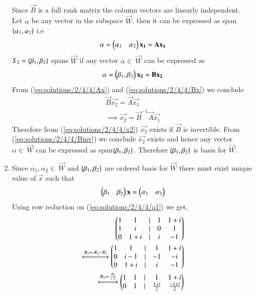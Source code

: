 \begin{enumerate}[label=\emph{\alph*)}]
\begin{align}
\end{align}
Since $\vec{B}$ is a full rank matrix the column vectors are linearly independent.\\
Let $\alpha$ be any vector in the subspace $\vec{W}$, then it can be expressed as 
span $\left\{\alpha_1,\alpha_2\right\}$ i.e
\begin{align}
	\alpha = \begin{pmatrix}\alpha_1 & \alpha_2\end{pmatrix}\mathbf{x_1} =\mathbf{A}\mathbf{x_1} \label{eq:solutions/2/4/4/Ax}
\end{align}
$S_2=\left\{\beta_1,\beta_2\right\}$ spans $\vec{W}$ if any vector $\alpha \in \ \vec{W}$ can be 
expressed as
\begin{align}
	\alpha=\begin{pmatrix}\beta_1,\beta_2\end{pmatrix}\mathbf{x_2}=\mathbf{B}\mathbf{x_2} \label{eq:solutions/2/4/4/Bx}
\end{align}
From (\ref{eq:solutions/2/4/4/Ax}) and (\ref{eq:solutions/2/4/4/Bx}) we conclude
\begin{align}
	\vec{B}\vec{x_2}=\vec{A}\vec{x_1}\\
	\implies \vec{x_2}=\vec{B}^{-1}\vec{A}\vec{x_1} \label{eq:solutions/2/4/4/x2}
\end{align}
Therefore from (\ref{eq:solutions/2/4/4/x2}) $\vec{x_2}$ exists if $\vec{B}$ is invertible. From
(\ref{eq:solutions/2/4/4/Binv}) we conclude $\vec{x_2}$ exists and hence any vector $\alpha \in \ \vec{W}$
can be expressed as span$\left\{\beta_1,\beta_2\right\}$. Therefore $\left\{\beta_1,\beta_2\right\}$
is basis for $\vec{W}$.
\item
	Since $\alpha_1,\alpha_2 \in \ \vec{W}$ and $\left\{\beta_1,\beta_2\right\}$ are ordered
	basis for $\vec{W}$ there must exist unique value of $\vec{x}$ such that
	\begin{align}
		\begin{pmatrix}\beta_1 & \beta_2\end{pmatrix}\mathbf{x}=\begin{pmatrix}\alpha_1 & \alpha_2\end{pmatrix} \label{eq:solutions/2/4/4/a1}
	\end{align}
Using row reduction on (\ref{eq:solutions/2/4/4/a1}) we get,
\begin{align}
	\begin{pmatrix}1 & 1 & | & 1 & 1+i\\
	       1 & i & | & 0 & 1\\
	       0 & 1+i &| & i & -1\end{pmatrix}\\
	\xleftrightarrow[]{R_2 \leftarrow R_2-R_1}
	\begin{pmatrix}1 & 1 & | & 1 & 1+i\\
	       0 & i-1 & | & -1 & -i\\
	       0 & 1+i &| & i & -1\end{pmatrix}\\
        \xleftrightarrow[]{R_2 \leftarrow \frac{R_2}{i-1}}
	\begin{pmatrix}1 & 1 & | & 1 & 1+i\\
	       0 & 1 & | & \frac{1+i}{2} & \frac{-1+i}{2}\\
\end{pmatrix}
\end{align}
\end{enumerate}
